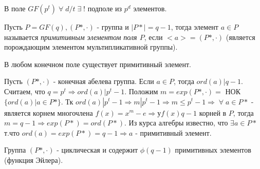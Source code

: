 \begin{sledsv}
  В поле $GF(p^t)\; \forall\; d/t\; \exists\;!$ подполе из $p^d$ элементов.
\end{sledsv}

\begin{defs}
  Пусть $P = GF(q), (P*, \cdot)$ - группа и $|P*| = q-1$, тогда элемент $a \in P$ называется \textit{примитивным элементом поля $P$}, если $<a> = (P*, \cdot)$ (является порождающим элементом мультипликативной группы).
\end{defs}

\begin{proofs}
	В любом конечном поле существует примитивный элемент.

  \begin{dokvo}
    Пусть $(P*, \cdot)$ -  конечная абелева группа. Если $a \in P$, тогда $ord(a) | q-1$. Считаем, что $q = p^t \Rightarrow ord(a) | p^t - 1$. Положим $m = exp(P*, \cdot) =$ 
    НОК$\{ord(a) |a \in P*\}$. Тк $ord(a) | p^t - 1 \Rightarrow m | p^t - 1 \Rightarrow m \leq p^t - 1 \Rightarrow\; \forall\; a \in P*$ - является корнем
    многочлена $f(x) = x^m - e \Rightarrow у f(x) q-1$ корней в $P$, тогда $m = q - 1 \Rightarrow exp(P*) = ord(P*)$. Из курса алгебры известно, что
    $\exists a \in P*$ т.что $ord(a) = exp(P*) = q - 1 \Rightarrow a$ - примитивный элемент.

	\end{dokvo}
\end{proofs}

\begin{sledsv}
  Группа $(P*, \cdot)$ - циклическая и содержит $\phi(q-1)$ примитивных элементов (функция Эйлера).
\end{sledsv}

\newpage
